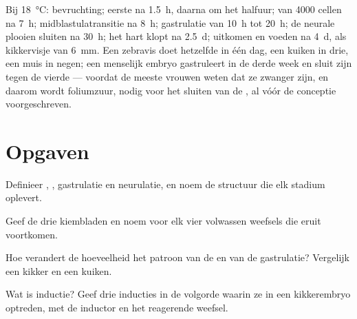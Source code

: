 \begin{example}\label{ex:b2:vertebrate-development:timetable}
Bij \qty{18}{\celsius}: bevruchting; eerste  na \qty{1.5}{h},
daarna om het halfuur;  van \num{4000} cellen na \qty{7}{h};
midblastulatransitie na \qty{8}{h}; gastrulatie van \qty{10}{h} tot
\qty{20}{h}; de neurale plooien sluiten na \qty{30}{h}; het hart klopt na
\qty{2.5}{d}; uitkomen en voeden na \qty{4}{d}, als kikkervisje van
\qty{6}{mm}. Een zebravis doet hetzelfde in één dag, een kuiken in drie,
een muis in negen; een menselijk embryo gastruleert in de derde week en
sluit zijn  tegen de vierde --- voordat de meeste vrouwen weten
dat ze zwanger zijn, en daarom wordt foliumzuur, nodig voor het sluiten van
de , al vóór de conceptie voorgeschreven.
\end{example}

\section{Opgaven}

\begin{exercise}[$\star$]\label{exo:b2:vertebrate-development:1}
Definieer , , gastrulatie en neurulatie, en noem de
structuur die elk stadium oplevert.
\end{exercise}

\begin{exercise}[$\star$]\label{exo:b2:vertebrate-development:2}
Geef de drie kiembladen en noem voor elk vier volwassen weefsels die eruit
voortkomen.
\end{exercise}

\begin{exercise}[$\star$]\label{exo:b2:vertebrate-development:3}
Hoe verandert de hoeveelheid  het patroon van de  en van de
gastrulatie? Vergelijk een kikker en een kuiken.
\end{exercise}

\begin{exercise}[$\star$]\label{exo:b2:vertebrate-development:4}
Wat is inductie? Geef drie inducties in de volgorde waarin ze in een
kikkerembryo optreden, met de inductor en het reagerende weefsel.
\end{exercise}

